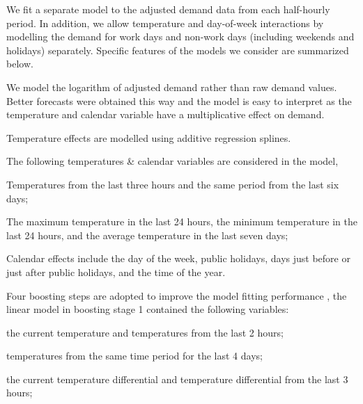 \documentclass[11pt]{article}
\begin{document}

We fit a separate model to the adjusted demand data from each half-hourly period. 
In addition, we allow temperature and day-of-week
interactions by modelling the demand for work days and non-work days (including weekends and
holidays) separately.
Specific features of the models we consider are summarized below.
\biz\itemsep=0cm
\item We model the logarithm of adjusted demand rather than raw demand values. Better forecasts were obtained this way and the model is easy to interpret as the temperature and calendar variable have a multiplicative effect on demand.

\item Temperature effects are modelled using additive regression splines.

\eiz

The following temperatures \& calendar variables are considered in the model,

\biz

\item Temperatures from the last three hours and the same period from the last six days;

\item The maximum temperature in the last 24 hours, the minimum temperature in the last 24 hours, and the average temperature in the last seven days;

\item Calendar effects include the day of the week, public holidays, days just before or just after public holidays, and the time of the year.

\eiz

Four boosting steps are adopted to improve the model fitting performance \citep{Tech15}, the linear model in boosting stage 1 contained the following variables:

\biz\itemsep=0cm
\item the current temperature and temperatures from the last 2 hours;

\item temperatures from the same time period for the last 4 days;

\item the current temperature differential and temperature differential from the last 3 hours;
\end{document}
